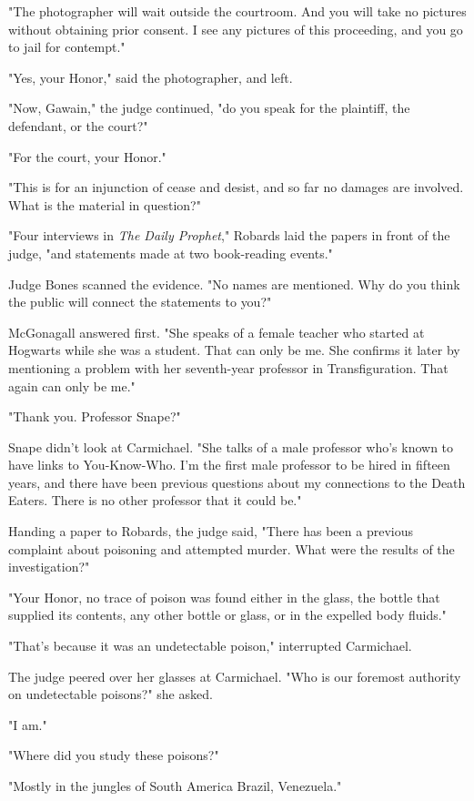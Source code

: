 "The photographer will wait outside the courtroom. And you will take no pictures without obtaining prior consent. I see any pictures of this proceeding, and you go to jail for contempt."

"Yes, your Honor," said the photographer, and left.

"Now, Gawain," the judge continued, "do you speak for the plaintiff, the defendant, or the court?"

"For the court, your Honor."

"This is for an injunction of cease and desist, and so far no damages are involved. What is the material in question?"

"Four interviews in \emph{The Daily Prophet}," Robards laid the papers in front of the judge, "and statements made at two book-reading events."

Judge Bones scanned the evidence. "No names are mentioned. Why do you think the public will connect the statements to you?"

McGonagall answered first. "She speaks of a female teacher who started at Hogwarts while she was a student. That can only be me. She confirms it later by mentioning a problem with her seventh-year professor in Transfiguration. That again can only be me."

"Thank you. Professor Snape?"

Snape didn't look at Carmichael. "She talks of a male professor who's known to have links to You-Know-Who. I'm the first male professor to be hired in fifteen years, and there have been previous questions about my connections to the Death Eaters. There is no other professor that it could be."

Handing a paper to Robards, the judge said, "There has been a previous complaint about poisoning and attempted murder. What were the results of the investigation?"

"Your Honor, no trace of poison was found either in the glass, the bottle that supplied its contents, any other bottle or glass, or in the expelled body fluids."

"That's because it was an undetectable poison," interrupted Carmichael.

The judge peered over her glasses at Carmichael. "Who is our foremost authority on undetectable poisons?" she asked.

"I am."

"Where did you study these poisons?"

"Mostly in the jungles of South America{\el} Brazil, Venezuela."

